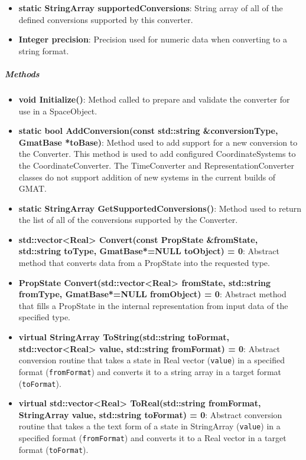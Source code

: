 \begin{itemize}
\item \textbf{static StringArray supportedConversions}: String array of all of the defined
conversions supported by this converter.
\item \textbf{Integer precision}: Precision used for numeric data when converting to a string
format.
\end{itemize}

\subparagraph{\textit{Methods}}

\begin{itemize}
\item \textbf{void Initialize()}: Method called to prepare and validate the converter for use in a
SpaceObject.
\item \textbf{static bool AddConversion(const std::string \&conversionType, GmatBase *toBase)}:
Method used to add support for a new conversion to the Converter.  This method is used to add
configured CoordinateSystems to the CoordinateConverter.  The TimeConverter and
RepresentationConverter classes do not support addition of new systems in the current builds of
GMAT.
\item \textbf{static StringArray GetSupportedConversions()}: Method used to return the list of all
of the conversions supported by the Converter.
\item \textbf{std::vector<Real> Convert(const PropState \&fromState, std::string toType,
GmatBase*=NULL
toObject) = 0}: Abstract method that converts data from a PropState into the requested type.
\item \textbf{PropState Convert(std::vector<Real> fromState, std::string fromType, GmatBase*=NULL
fromObject) = 0}: Abstract method that fills a PropState in the internal representation from
input data of the specified type.
\item \textbf{virtual StringArray ToString(std::string toFormat, std::vector<Real> value,
std::string fromFormat) = 0}: Abstract conversion routine that takes a state in Real vector
(\texttt{value}) in a specified format (\texttt{fromFormat}) and converts it to a string array in a
target format (\texttt{toFormat}).
\item \textbf{virtual std::vector<Real> ToReal(std::string fromFormat, StringArray value,
std::string toFormat) = 0}: Abstract conversion routine that takes a the text form of a state in
StringArray (\texttt{value}) in a specified format (\texttt{fromFormat}) and converts it to a Real
vector in a target format (\texttt{toFormat}).
\end{itemize}

